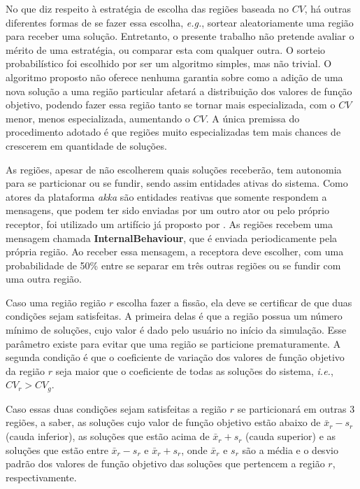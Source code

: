 No que diz respeito à estratégia de escolha das regiões baseada no $CV$, há outras diferentes formas de se fazer essa escolha, \textit{e.g.}, sortear aleatoriamente uma região para receber uma solução. Entretanto, o presente trabalho não pretende avaliar o mérito de uma estratégia, ou comparar esta com qualquer outra. O sorteio probabilístico foi escolhido por ser um algoritmo simples, mas não trivial. O algoritmo proposto não oferece nenhuma garantia sobre como a adição de uma nova solução a uma região particular afetará a distribuição dos valores de função objetivo, podendo fazer essa região tanto se tornar mais especializada, com o $CV$ menor, menos especializada, aumentando  o $CV$. A única premissa do procedimento adotado é que regiões muito especializadas tem mais chances de crescerem em quantidade de soluções. 

As regiões, apesar de não escolherem quais soluções receberão, tem autonomia para se particionar ou se fundir, sendo assim entidades ativas do sistema. Como atores da plataforma \textit{akka} são entidades reativas que somente respondem a mensagens, que podem ter sido enviadas por um outro ator ou pelo próprio receptor, foi utilizado um artifício já proposto por . As regiões recebem uma mensagem chamada \textbf{InternalBehaviour}, que é enviada periodicamente pela própria região. Ao receber essa mensagem, a receptora deve escolher, com uma probabilidade de 50\% entre se separar em três outras regiões ou se fundir com uma outra região.


Caso uma região região $r$ escolha fazer a fissão, ela deve se certificar de que  duas condições sejam satisfeitas. A primeira delas é que a região possua um número mínimo de soluções, cujo valor é dado pelo usuário no início da simulação. Esse parâmetro existe para evitar que uma região se particione prematuramente. A segunda condição é que o coeficiente de variação dos valores de função objetivo da região $r$ seja maior que o coeficiente de todas as soluções do sistema, \textit{i.e.},  $CV_r > CV_g$. 

Caso essas duas condições sejam satisfeitas a região $r$ se particionará em outras 3 regiões, a saber, as soluções cujo valor de função objetivo estão abaixo de $\bar{x}_{r} - s_{r}$ (cauda inferior), as soluções que estão acima de $\bar{x}_{r} + s_{r}$ (cauda superior) e as soluções que estão entre $\bar{x}_{r} - s_{r}$ e  $\bar{x}_{r} + s_{r}$, onde $\bar{x}_r$ e $s_r$ são a média e o desvio padrão dos valores de função objetivo das soluções que pertencem a região $r$, respectivamente. 

